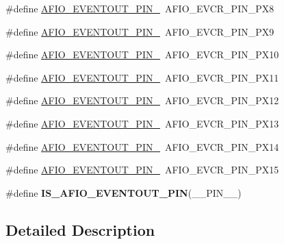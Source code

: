 \begin{DoxyCompactItemize}
\item 
\#define \hyperlink{group___g_p_i_o_ex___e_v_e_n_t_o_u_t___p_i_n_gaed7094c896c9284edbb2267a74e148a6}{A\+F\+I\+O\+\_\+\+E\+V\+E\+N\+T\+O\+U\+T\+\_\+\+P\+I\+N\+\_}~A\+F\+I\+O\+\_\+\+E\+V\+C\+R\+\_\+\+P\+I\+N\+\_\+\+P\+X8
\item 
\#define \hyperlink{group___g_p_i_o_ex___e_v_e_n_t_o_u_t___p_i_n_gacb2d76e8d7197ff9f65634034cb47ca1}{A\+F\+I\+O\+\_\+\+E\+V\+E\+N\+T\+O\+U\+T\+\_\+\+P\+I\+N\+\_}~A\+F\+I\+O\+\_\+\+E\+V\+C\+R\+\_\+\+P\+I\+N\+\_\+\+P\+X9
\item 
\#define \hyperlink{group___g_p_i_o_ex___e_v_e_n_t_o_u_t___p_i_n_ga2890d890882a1d2c32fc2a4d47117bfb}{A\+F\+I\+O\+\_\+\+E\+V\+E\+N\+T\+O\+U\+T\+\_\+\+P\+I\+N\+\_}~A\+F\+I\+O\+\_\+\+E\+V\+C\+R\+\_\+\+P\+I\+N\+\_\+\+P\+X10
\item 
\#define \hyperlink{group___g_p_i_o_ex___e_v_e_n_t_o_u_t___p_i_n_gaf36cec461fe61b6060137724f6ad3148}{A\+F\+I\+O\+\_\+\+E\+V\+E\+N\+T\+O\+U\+T\+\_\+\+P\+I\+N\+\_}~A\+F\+I\+O\+\_\+\+E\+V\+C\+R\+\_\+\+P\+I\+N\+\_\+\+P\+X11
\item 
\#define \hyperlink{group___g_p_i_o_ex___e_v_e_n_t_o_u_t___p_i_n_ga736b25c4c65a79dc259a6b7592c46d2a}{A\+F\+I\+O\+\_\+\+E\+V\+E\+N\+T\+O\+U\+T\+\_\+\+P\+I\+N\+\_}~A\+F\+I\+O\+\_\+\+E\+V\+C\+R\+\_\+\+P\+I\+N\+\_\+\+P\+X12
\item 
\#define \hyperlink{group___g_p_i_o_ex___e_v_e_n_t_o_u_t___p_i_n_ga990d0bda08e8837940fe244359e04da9}{A\+F\+I\+O\+\_\+\+E\+V\+E\+N\+T\+O\+U\+T\+\_\+\+P\+I\+N\+\_}~A\+F\+I\+O\+\_\+\+E\+V\+C\+R\+\_\+\+P\+I\+N\+\_\+\+P\+X13
\item 
\#define \hyperlink{group___g_p_i_o_ex___e_v_e_n_t_o_u_t___p_i_n_ga32432319feb5904520558d1ed5c74c81}{A\+F\+I\+O\+\_\+\+E\+V\+E\+N\+T\+O\+U\+T\+\_\+\+P\+I\+N\+\_}~A\+F\+I\+O\+\_\+\+E\+V\+C\+R\+\_\+\+P\+I\+N\+\_\+\+P\+X14
\item 
\#define \hyperlink{group___g_p_i_o_ex___e_v_e_n_t_o_u_t___p_i_n_ga09637caad04c7fb41cf804489e5d6037}{A\+F\+I\+O\+\_\+\+E\+V\+E\+N\+T\+O\+U\+T\+\_\+\+P\+I\+N\+\_}~A\+F\+I\+O\+\_\+\+E\+V\+C\+R\+\_\+\+P\+I\+N\+\_\+\+P\+X15
\item 
\#define {\bfseries I\+S\+\_\+\+A\+F\+I\+O\+\_\+\+E\+V\+E\+N\+T\+O\+U\+T\+\_\+\+P\+IN}(\+\_\+\+\_\+\+P\+I\+N\+\_\+\+\_\+)
\end{DoxyCompactItemize}


\subsection{Detailed Description}


